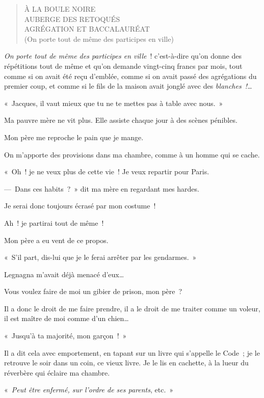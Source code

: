 \documentclass[french,twoside]{book} %
\begin{document}
\begin{verse}
À LA BOULE NOIRE\\
AUBERGE DES RETOQUÉS\\
AGRÉGATION ET BACCALAURÉAT\\
(On porte tout de même des participes en ville)\\
\end{verse}

\noindent \emph{On porte tout de même des participes en ville} ! c’est-à-dire qu’on donne des répétitions tout de même et qu’on demande vingt-cinq francs par mois, tout comme si on avait été reçu d’emblée, comme si on avait passé des agrégations du premier coup, et comme si le fils de la maison avait jonglé avec des \emph{blanches !…}\par
\bigbreak
\noindent « Jacques, il vaut mieux que tu ne te mettes pas à table avec nous. »\par
Ma pauvre mère ne vit plus. Elle assiste chaque jour à des scènes pénibles.\par
Mon père me reproche le pain que je mange.\par
On m’apporte des provisions dans ma chambre, comme à un homme qui se cache.\par
« Oh ! je ne veux plus de cette vie ! Je veux repartir pour Paris.\par
— Dans ces habits ? » dit ma mère en regardant mes hardes.\par
Je serai donc toujours écrasé par mon costume !\par
Ah ! je partirai tout de même !\par
Mon père a eu vent de ce propos.\par
« S’il part, dis-lui que je le ferai arrêter par les gendarmes. »\par
Legnagna m’avait déjà menacé d’eux…\par
Vous voulez faire de moi un gibier de prison, mon père ?\par
Il a donc le droit de me faire prendre, il a le droit de me traiter comme un voleur, il est maître de moi comme d’un chien…\par
« Jusqu’à ta majorité, mon garçon ! »\par
Il a dit cela avec emportement, en tapant sur un livre qui s’appelle le Code ; je le retrouve le soir dans un coin, ce vieux livre. Je le lis en cachette, à la lueur du réverbère qui éclaire ma chambre.\par
« \emph{Peut être enfermé, sur l’ordre de ses parents}, etc. »\par
\end{document}
